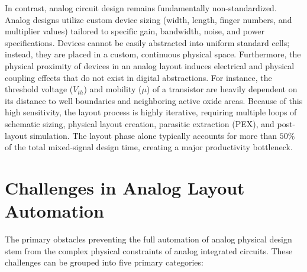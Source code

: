 In contrast, analog circuit design remains fundamentally non-standardized. Analog designs utilize custom device sizing (width, length, finger numbers, and multiplier values) tailored to specific gain, bandwidth, noise, and power specifications. Devices cannot be easily abstracted into uniform standard cells; instead, they are placed in a custom, continuous physical space. Furthermore, the physical proximity of devices in an analog layout induces electrical and physical coupling effects that do not exist in digital abstractions. For instance, the threshold voltage ($V_{th}$) and mobility ($\mu$) of a transistor are heavily dependent on its distance to well boundaries and neighboring active oxide areas. Because of this high sensitivity, the layout process is highly iterative, requiring multiple loops of schematic sizing, physical layout creation, parasitic extraction (PEX), and post-layout simulation. The layout phase alone typically accounts for more than $50\%$ of the total mixed-signal design time, creating a major productivity bottleneck.

\section{Challenges in Analog Layout Automation}
\label{sec:motivation}

The primary obstacles preventing the full automation of analog physical design stem from the complex physical constraints of analog integrated circuits. These challenges can be grouped into five primary categories:

